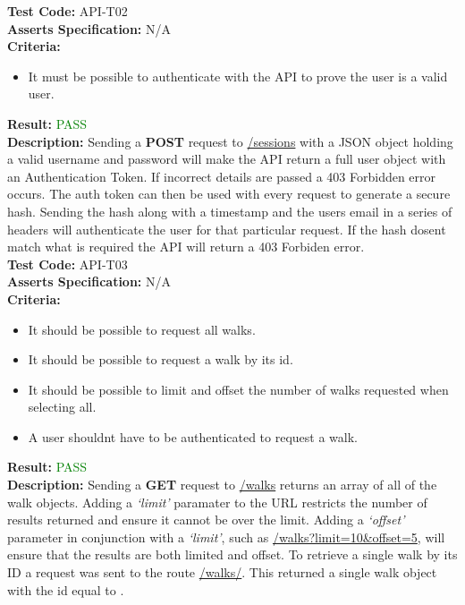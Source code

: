 \documentclass[11pt,a4paper]{report}
\begin{document}
\label{test:API-T02}
\noindent\textbf{Test Code:} API-T02\\
\textbf{Asserts Specification:} N/A \\ 
\textbf{Criteria:} \begin{itemize}
                     \item It must be possible to authenticate with the API to prove the user is a valid user. 
                   \end{itemize}  
\textbf{Result:} \textcolor{green}{PASS}\\ 
\textbf{Description:} Sending a \textbf{POST} request to \url{/sessions} with a JSON object holding a valid username and password will make the API return a full user object with an Authentication Token. If incorrect details are passed a 403 Forbidden error occurs. The auth token can then be used with every request to generate a secure hash. Sending the hash along with a timestamp and the users email in a series of headers will authenticate the user for that particular request. If the hash dosent match what is required the API will return a 403 Forbiden error. \\ 

\label{test:API-T03}
\noindent\textbf{Test Code:} API-T03\\
\textbf{Asserts Specification:} N/A \\ 
\textbf{Criteria:} \begin{itemize}
                     \item It should be possible to request all walks.
                     \item It should be possible to request a walk by its id.
                     \item It should be possible to limit and offset the number of walks requested when selecting all.
                     \item A user shouldnt have to be authenticated to request a walk.
                   \end{itemize}  
\textbf{Result:} \textcolor{green}{PASS}\\ 
\textbf{Description:} Sending a \textbf{GET} request to \url{/walks} returns an array of all of the walk objects. Adding a \textit{`limit'} paramater to the URL restricts the number of results returned and ensure it cannot be over the limit. Adding a \textit{`offset'} parameter in conjunction with a \textit{`limit'}, such as \url{/walks?limit=10&offset=5}, will ensure that the results are both limited and offset. To retrieve a single walk by its ID a request was sent to the route \url{/walks/}. This returned a single walk object with the id equal to . \\ 
\end{document}
